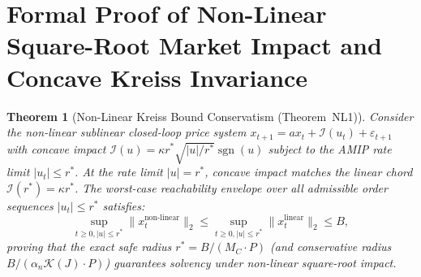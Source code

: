 \documentclass[11pt,a4paper]{article}
\newtheorem{theorem}{Theorem}[section]
\theoremstyle{definition}\newtheorem{definition}[theorem]{Definition}
\theoremstyle{remark}\newtheorem{remark}[theorem]{Remark}
\begin{document}
\section{Formal Proof of Non-Linear Square-Root Market Impact and Concave Kreiss Invariance}
\label{sec:supp_square_root_impact}
\begin{theorem}[Non-Linear Kreiss Bound Conservatism (Theorem~NL1)]\label{thm:supp_nl1}
Consider the non-linear sublinear closed-loop price system $x_{t+1} = a x_t + \mathcal{I}(u_t) + \varepsilon_{t+1}$ with concave impact $\mathcal{I}(u) = \kappa r^* \sqrt{|u| / r^*} \operatorname{sgn}(u)$ \cite{bouchaud2004fluctuations,gatheral2010no} subject to the AMIP rate limit $|u_t| \le r^*$.
At the rate limit $|u| = r^*$, concave impact matches the linear chord $\mathcal{I}(r^*) = \kappa r^*$. The worst-case reachability envelope over all admissible order sequences $|u_t| \le r^*$ satisfies:
\begin{equation}
\sup_{t \ge 0, |u| \le r^*} \|x_t^{\text{non-linear}}\|_2 \le \sup_{t \ge 0, |u| \le r^*} \|x_t^{\text{linear}}\|_2 \le B,
\end{equation}
proving that the exact safe radius $r^* = B / (M_C \cdot P)$ (and conservative radius $B / (\alpha_n \mathcal{K}(J) \cdot P)$) guarantees solvency under non-linear square-root impact.
\end{theorem}
\end{document}
